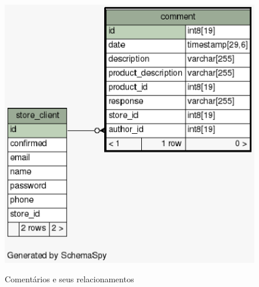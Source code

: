 \documentclass[a4paper,12pt]{monografia}
\begin{document}
\begin{figure}[H]
\centering
\caption{Comentários e seus relacionamentos}
\centering
\includegraphics[scale=0.7]{img/diagramas/schema/comment.1degree.png.eps}\\
\end{figure}
\end{document}
